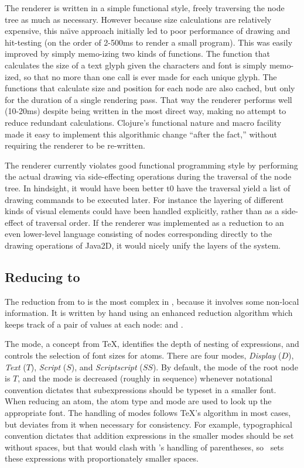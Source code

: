 The renderer is written in a simple functional style, freely traversing the node tree as much as necessary. However because size calculations are relatively expensive, this na\"{\i}ve  approach initially led to poor performance of drawing and hit-testing (on the order of 2-500ms to render a small program). This was easily improved by simply memo-izing two kinds of functions. The function that calculates the size of a text glyph given the characters and font is simply memo-ized, so that no more than one call is ever made for each unique glyph. The functions that calculate size and position for each node are also cached, but only for the duration of a single rendering pass. That way the renderer performs well (10-20ms) despite being written in the most direct way, making no attempt to reduce redundant calculations. Clojure's functional nature and macro facility made it easy to implement this algorithmic change ``after the fact,'' without requiring the renderer to be re-written.

The renderer currently violates good functional programming style by performing the actual drawing via side-effecting operations during the traversal of the node tree. In hindsight, it would have been better t0 have the traversal yield a list of drawing commands to be executed later. For instance the layering of different kinds of visual elements could have been handled explicitly, rather than as a side-effect of traversal order. If the renderer was implemented as a reduction to an even lower-level language consisting of nodes corresponding directly to the drawing operations of Java2D, it would nicely unify the layers of the system.


\subsection{Reducing  to }
The reduction from  to  is the most complex in \Meta, because it involves some non-local information. It is written by hand using an enhanced reduction algorithm which keeps track of a pair of values at each node:  and .

The mode, a concept from \TeX, identifies the depth of nesting of expressions, and controls the selection of font sizes for atoms. There are four modes, \textit{Display} ($D$), \textit{Text} ($T$), \textit{Script} ($S$), and \textit{Scriptscript} ($SS$). By default, the mode of the root node is $T$, and the mode is decreased (roughly in sequence) whenever notational convention dictates that subexpressions should be typeset in a smaller font. When reducing an atom, the atom type and mode are used to look up the appropriate font. The handling of modes follows \TeX's algorithm in most cases, but deviates from it when necessary for consistency. For example, typographical convention dictates that addition expressions in the smaller modes should be set without spaces, but that would clash with \Meta's handling of parentheses, so \Meta\ sets these expressions with proportionately smaller spaces.

